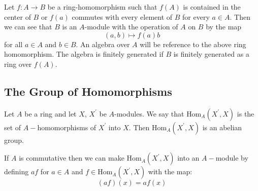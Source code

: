 \documentclass{report}
\begin{document}
Let $f: A \rightarrow B$ be a ring-homomorphism such that $f(A)$ is contained in the center of $B$ or $f(a)$ commutes with every element of $B$ for every $a \in A$. Then we can see that $B$ is an $A$-module with the operation of $A$ on $B$ by the map
    \begin{equation*}
        (a, b) \mapsto f(a)b
    \end{equation*}
for all $a \in A$ and $b \in B$. An algebra over $A$ will be reference to the above ring homomorphism. The algebra is finitely generated if $B$ is finitely generated as a ring over $f(A)$.

\begin{topic}
    \section{The Group of Homomorphisms}
\end{topic}

Let $A$ be a ring and let $X$, $X^{\prime}$ be $A$-modules. We say that $\text{Hom}_{A}(X^{\prime}, X)$ is the set of $A-$homomorphisms of $X^{\prime}$ into $X$. Then $\text{Hom}_{A}(X^{\prime}, X)$ is an abelian group.

If $A$ is commutative then we can make $\text{Hom}_{A}(X^{\prime}, X)$ into an $A-$module by defining $af$ for $a\in A$ and $f \in \text{Hom}_{A}(X^{\prime}, X)$ with the map:
    \begin{equation*}
        (af)(x) = af(x)
    \end{equation*}
\end{document}
